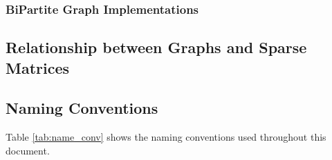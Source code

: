 \subsubsection{BiPartite Graph Implementations}


\subsection{Relationship between Graphs and Sparse Matrices}



\subsection{Naming Conventions}


Table \ref{tab:name_conv} shows the naming conventions used throughout this document. 

